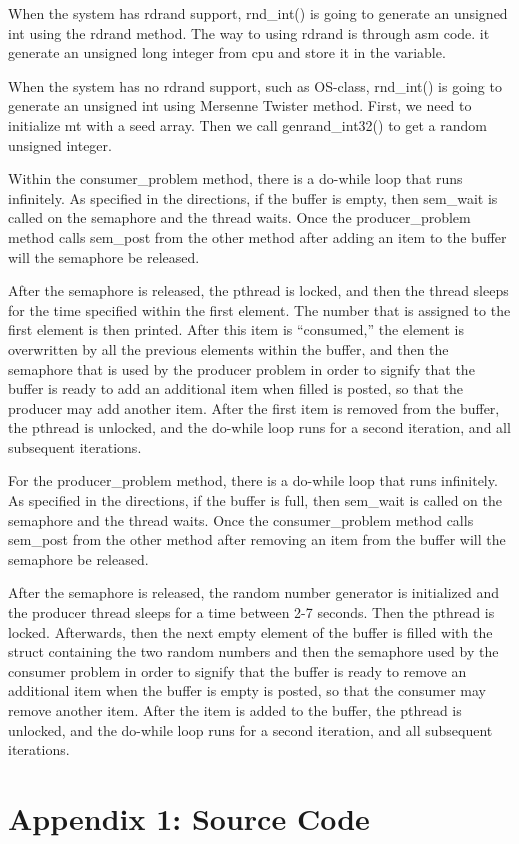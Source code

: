 \documentclass[letterpaper,10pt]{article}
\begin{document}
When the system has rdrand support, rnd\_int() is going to generate an unsigned int using the rdrand method. The way to using rdrand is through asm code. it generate an unsigned long integer from cpu and store it in the variable.\par

When the system has no rdrand support, such as OS-class, rnd\_int() is going to generate an unsigned int using Mersenne Twister method. First, we need to initialize mt with a seed array. Then we  call genrand\_int32() to get a random unsigned integer.\par

Within the consumer\_problem method, there is a do-while loop that runs infinitely. As specified in the directions, if the buffer is empty, then sem\_wait is called on the semaphore and the thread waits. Once the producer\_problem method calls sem\_post from the other method after adding an item to the buffer will the semaphore be released.\par

After the semaphore is released, the pthread is locked, and then the thread sleeps for the time specified within the first element. The number that is assigned to the first element is then printed. After this item is “consumed,” the element is overwritten by all the previous elements within the buffer, and then the semaphore that is used by the producer problem in order to signify that the buffer is ready to add an additional item when filled is posted, so that the producer may add another item. After the first item is removed from the buffer, the pthread is unlocked, and the do-while loop runs for a second iteration, and all subsequent iterations.\par

For the producer\_problem method, there is a do-while loop that runs infinitely. As specified in the directions, if the buffer is full, then sem\_wait is called on the semaphore and the thread waits. Once the consumer\_problem method calls sem\_post from the other method after removing an item from the buffer will the semaphore be released.\par

After the semaphore is released, the random number generator is initialized and the producer thread sleeps for a time between 2-7 seconds. Then the pthread is locked. Afterwards, then the next empty element of the buffer is filled with the struct containing the two random numbers and then the semaphore used by the consumer problem in order to signify that the buffer is ready to remove an additional item when the buffer is empty is posted, so that the consumer may remove another item. After the item is added to the buffer, the pthread is unlocked, and the do-while loop runs for a second iteration, and all subsequent iterations.\par

\section*{Appendix 1: Source Code}


%
%
\end{document}

